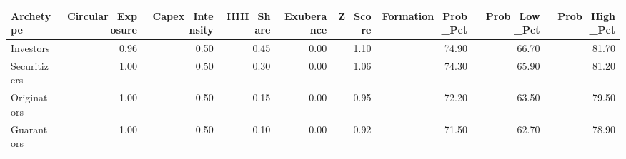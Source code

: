 \begin{tabular}{lrrrrrrrr}
\toprule
Archetype & Circular_Exposure & Capex_Intensity & HHI_Share & Exuberance & Z_Score & Formation_Prob_Pct & Prob_Low_Pct & Prob_High_Pct \\
\midrule
Investors & 0.96 & 0.50 & 0.45 & 0.00 & 1.10 & 74.90 & 66.70 & 81.70 \\
Securitizers & 1.00 & 0.50 & 0.30 & 0.00 & 1.06 & 74.30 & 65.90 & 81.20 \\
Originators & 1.00 & 0.50 & 0.15 & 0.00 & 0.95 & 72.20 & 63.50 & 79.50 \\
Guarantors & 1.00 & 0.50 & 0.10 & 0.00 & 0.92 & 71.50 & 62.70 & 78.90 \\
\bottomrule
\end{tabular}
